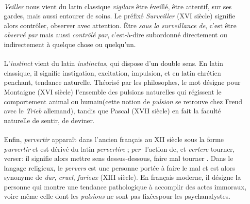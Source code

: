 \paragraph{} \emph{Veiller} nous vient du latin classique \emph{vigilare} \guillemotleft être éveillé, être attentif, sur
ses gardes\guillemotright, mais aussi \guillemotleft entourer de soins\guillemotright \cite{Surveillance0}. Le préfixé
\emph{Surveiller} (XVI siècle) signifie alors \guillemotleft contrôler, observer avec attention\guillemotright.
Être \emph{sous la surveillance de}, c'est être \emph{observé par} mais aussi \emph{contrôlé par}, c'est-à-dire subordonné
directement ou indirectement à quelque chose ou quelqu'un.

\paragraph{} L'\emph{instinct} vient du latin \emph{instinctus}, qui dispose d'un double sens. En latin classique, il 
signifie \guillemotleft instigation, excitation, impulsion\guillemotright, et en latin chrétien \guillemotleft penchant,
tendance naturelle\guillemotright \cite{Instinct0}. Théorisé par les philosophes, le mot désigne pour Montaigne (XVI siècle) 
\guillemotleft l'ensemble des pulsions naturelles qui régissent le comportement animal ou humain\guillemotright (cette 
notion de \emph{pulsion} se retrouve chez Freud avec le \emph{Trieb} allemand), tandis que Pascal (XVII siècle)
en fait \guillemotleft la faculté naturelle de sentir, de deviner\guillemotright.

\paragraph{} Enfin, \emph{pervertir} apparaît dans l'ancien français au XII siècle sous la forme \emph{purvertir} et est
dérivé du latin \emph{pervertire} ; \emph{per-} \guillemotleft l'action de\guillemotright, et \emph{vertere} \guillemotleft
tourner, verser\guillemotright : il signifie alors \guillemotleft mettre sens dessus-dessous, faire mal tourner\guillemotright
\cite{Pervers0}. Dans le langage religieux, le \emph{pervers} est une personne \guillemotleft portée à faire le mal\guillemotright
et est alors synonyme de \emph{dur}, \emph{cruel}, \emph{furieux} (XIII siècle). En français moderne, il désigne 
\guillemotleft la personne qui montre une tendance pathologique à accomplir des actes immoraux\guillemotright, voire même
celle \guillemotleft dont les \emph{pulsions} ne sont pas fixées\guillemotright pour les psychanalystes.

